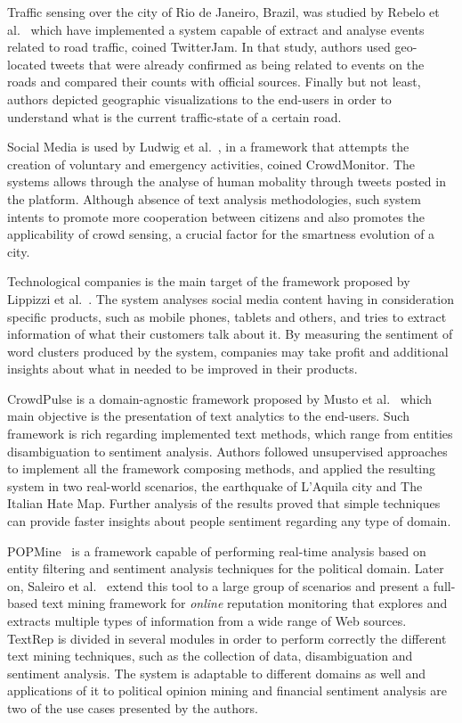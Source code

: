 Traffic sensing over the city of Rio de Janeiro, Brazil, was studied by Rebelo et al.~\cite{rebelo2015twitterjam} which have implemented a system capable of extract and analyse events related to road traffic, coined  TwitterJam. In that study, authors used geo-located tweets that were already confirmed as being related to events on the roads and compared their counts with official sources. Finally but not least, authors depicted geographic visualizations to the end-users in order to understand what is the current traffic-state of a certain road.

Social Media is used by Ludwig et al.~\cite{kn:Ludwig2015}, in a framework that attempts the creation of voluntary and emergency activities, coined CrowdMonitor. The systems allows through the analyse of human mobality through tweets posted in the platform. Although absence of text analysis methodologies, such system intents to promote more cooperation between citizens and also promotes the applicability of crowd sensing, a crucial factor for the smartness evolution of a city.

Technological companies is the main target of the framework proposed by Lippizzi et al.~\cite{kn:Lipizzi2015}. The system analyses social media content having in consideration specific products, such as mobile phones, tablets and others, and tries to extract information of what their customers talk about it. By measuring the sentiment of word clusters produced by the system, companies may take profit and additional insights about what in needed to be improved in their products.

CrowdPulse is a domain-agnostic framework proposed by Musto et al.~\cite{musto2015crowdpulse} which main objective is the presentation of text analytics to the end-users. Such framework is rich regarding implemented text methods, which range from entities disambiguation to sentiment analysis. Authors followed unsupervised approaches to implement all the framework composing methods, and applied the resulting system in two real-world scenarios, the earthquake of L'Aquila city and The Italian Hate Map. Further analysis of the results proved that simple techniques can provide faster insights about people sentiment regarding any type of domain.

POPMine~\cite{saleiro2015popmine} is a framework capable of performing real-time analysis based on entity filtering and sentiment analysis techniques for the political domain. Later on, Saleiro et al.~\cite{saleiro2017texrep} extend this tool to a large group of scenarios and present a full-based text mining framework for \textit{online} reputation monitoring that explores and extracts multiple types of information from a wide range of Web sources. TextRep is divided in several modules in order to perform correctly the different text mining techniques, such as the collection of data, disambiguation and sentiment analysis. The system is adaptable to different domains as well and applications of it to political opinion mining and financial sentiment analysis are two of the use cases presented by the authors.

